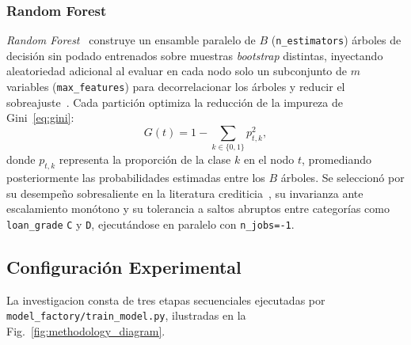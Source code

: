 \documentclass[conference]{IEEEtran}
\begin{document}
\subsubsection{Random Forest}
\textit{Random Forest}~\cite{breiman2001random,muller2016introduction} construye un ensamble paralelo de $B$ (\texttt{n\_estimators}) árboles de decisión sin podado entrenados sobre muestras \textit{bootstrap} distintas, inyectando aleatoriedad adicional al evaluar en cada nodo solo un subconjunto de $m$ variables (\texttt{max\_features}) para decorrelacionar los árboles y reducir el sobreajuste~\cite{muller2016introduction}. Cada partición optimiza la reducción de la impureza de Gini~\eqref{eq:gini}:
\begin{equation}
G(t) = 1 - \sum_{k \in \{0,1\}} p_{t,k}^2,
\label{eq:gini}
\end{equation}
donde $p_{t,k}$ representa la proporción de la clase $k$ en el nodo $t$, promediando posteriormente las probabilidades estimadas entre los $B$ árboles. Se seleccionó por su desempeño sobresaliente en la literatura crediticia~\cite{pucar2026consumer,maurino2025dataquality,mahmud2025stacking}, su invarianza ante escalamiento monótono y su tolerancia a saltos abruptos entre categorías como \texttt{loan\_grade} \texttt{C} y \texttt{D}, ejecutándose en paralelo con \texttt{n\_jobs=-1}.

\subsection{Configuración Experimental}

La investigacion consta de tres etapas secuenciales ejecutadas por \texttt{model\_factory/train\_model.py}, ilustradas en la Fig.~\ref{fig:methodology_diagram}.
\end{document}
